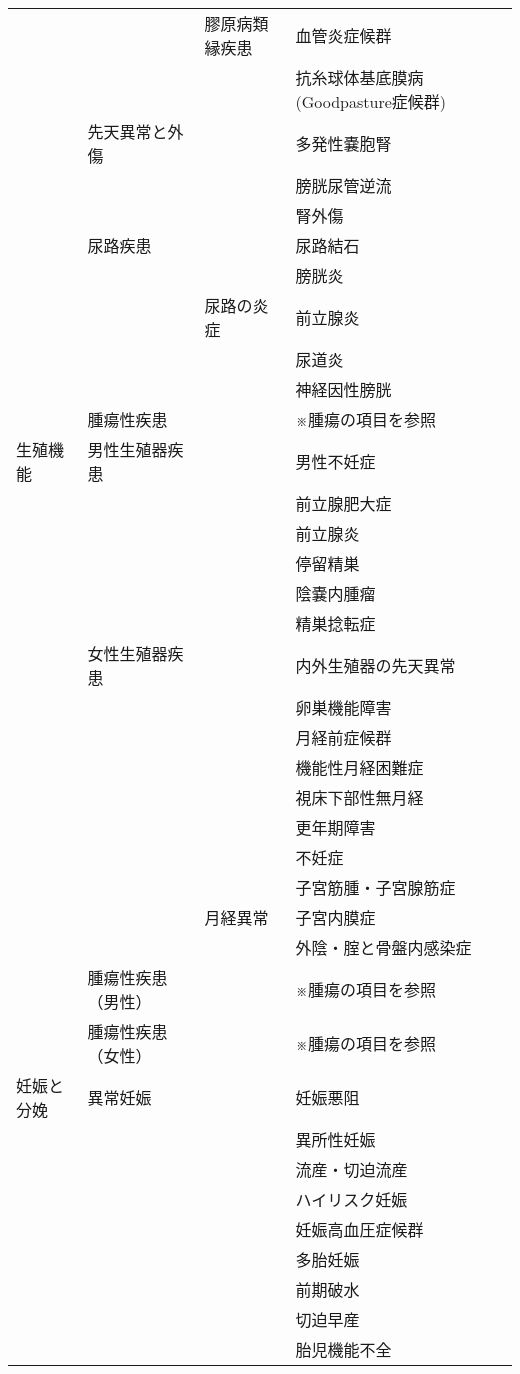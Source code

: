 \begin{xltabular}{\linewidth}{XXXX}
 &  & 膠原病類縁疾患 & 血管炎症候群 \\
 &  &  & 抗糸球体基底膜病(Goodpasture症候群) \\
 & 先天異常と外傷 &  & 多発性嚢胞腎 \\
 &  &  & 膀胱尿管逆流 \\
 &  &  & 腎外傷 \\
 & 尿路疾患 &  & 尿路結石 \\
 &  &  & 膀胱炎 \\
 &  & 尿路の炎症 & 前立腺炎 \\
 &  &  & 尿道炎 \\
 &  &  & 神経因性膀胱 \\
 & 腫瘍性疾患 &  & ※腫瘍の項目を参照 \\
生殖機能 & 男性生殖器疾患 &  & 男性不妊症 \\
 &  &  & 前立腺肥大症 \\
 &  &  & 前立腺炎 \\
 &  &  & 停留精巣 \\
 &  &  & 陰嚢内腫瘤 \\
 &  &  & 精巣捻転症 \\
 & 女性生殖器疾患 &  & 内外生殖器の先天異常 \\
 &  &  & 卵巣機能障害 \\
 &  &  & 月経前症候群 \\
 &  &  & 機能性月経困難症 \\
 &  &  & 視床下部性無月経 \\
 &  &  & 更年期障害 \\
 &  &  & 不妊症 \\
 &  &  & 子宮筋腫・子宮腺筋症 \\
 &  & 月経異常 & 子宮内膜症 \\
 &  &  & 外陰・腟と骨盤内感染症 \\
 & 腫瘍性疾患（男性） &  & ※腫瘍の項目を参照 \\
 & 腫瘍性疾患（女性） &  & ※腫瘍の項目を参照 \\
妊娠と分娩 & 異常妊娠 &  & 妊娠悪阻 \\
 &  &  & 異所性妊娠 \\
 &  &  & 流産・切迫流産 \\
 &  &  & ハイリスク妊娠 \\
 &  &  & 妊娠高血圧症候群 \\
 &  &  & 多胎妊娠 \\
 &  &  & 前期破水 \\
 &  &  & 切迫早産 \\
 &  &  & 胎児機能不全 \\

\end{xltabular}
